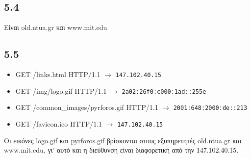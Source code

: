 		\subsection*{5.4}
			Είναι old.ntua.gr και www.mit.edu

		\subsection*{5.5}
			\begin{itemize}
				\item GET /links.html HTTP/1.1 $\rightarrow$ \verb|147.102.40.15|
				\item GET /img/logo.gif HTTP/1.1 $\rightarrow$ \verb|2a02:26f0:c000:1ad::255e|
				\item GET /common\_images/pyrforos.gif HTTP/1.1 $\rightarrow$ \verb|2001:648:2000:de::213|
				\item GET /favicon.ico HTTP/1.1 $\rightarrow$ \verb|147.102.40.15|
			\end{itemize}
		
			Οι εικόνες logo.gif και pyrforos.gif βρίσκονται στους εξυπηρετητές old.ntua.gr και www.mit.edu, γι' αυτό και η διεύθυνση είναι διαφορετική από την 147.102.40.15.
